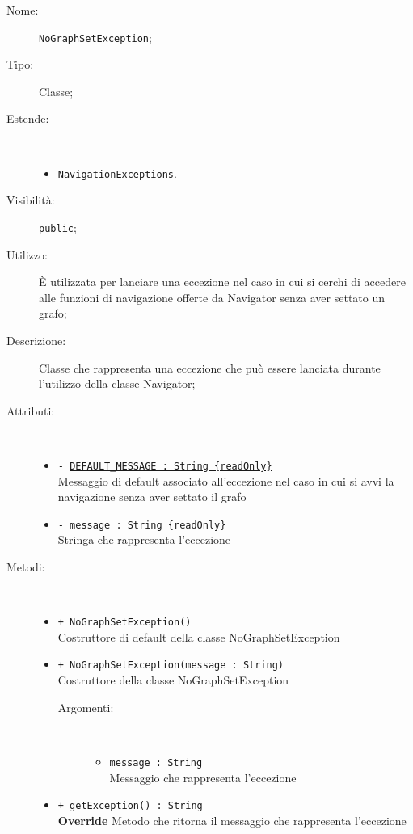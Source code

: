 \documentclass[../DefinizioneDiProdotto.tex]{subfiles}
\begin{document}
\begin{description}
	\item[Nome:] \texttt{NoGraphSetException};
	\item[Tipo:] Classe;
	\item[Estende:] \
	\begin{itemize}
		\item \texttt{NavigationExceptions}.
	\end{itemize}
	\item[Visibilità:] \texttt{public};
	\item[Utilizzo:] È utilizzata per lanciare una eccezione nel caso in cui si cerchi di accedere alle funzioni di navigazione offerte da Navigator senza aver settato un grafo;
	\item[Descrizione:] Classe che rappresenta una eccezione che può essere lanciata durante l'utilizzo della classe Navigator;
	\item[Attributi:] \
	\begin{itemize}
		\item \texttt{- \underline{DEFAULT\_MESSAGE : String \{readOnly\}}}\\
		Messaggio di default associato all'eccezione nel caso in cui si avvi la navigazione senza aver settato il grafo
		
		\item \texttt{- message : String \{readOnly\}}\\
		Stringa che rappresenta l'eccezione
		
	\end{itemize}
	\item[Metodi:] \
	\begin{itemize}
		\item \texttt{+ NoGraphSetException()}\\
		Costruttore di default della classe NoGraphSetException
		\item \texttt{+ NoGraphSetException(message : String)}\\
		Costruttore della classe NoGraphSetException
		\begin{description}
			\item[Argomenti:] \
			\begin{itemize}
				\item \texttt{message : String}\\
				Messaggio che rappresenta l'eccezione\end{itemize}
		\end{description}
		\item \texttt{+ getException() : String}\\
		\textbf{Override} Metodo che ritorna il messaggio che rappresenta l'eccezione
	\end{itemize}
\end{description}
\end{document}
